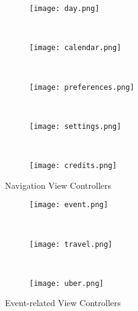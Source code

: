 \begin{figure}[H]
	\centering
	\begin{subfigure}{0.25\textwidth}
		\centering
		\texttt{[image: day.png]}
	\end{subfigure}
	~
	\begin{subfigure}{0.25\textwidth}
		\centering
		\texttt{[image: calendar.png]}
	\end{subfigure}
	~
	\begin{subfigure}{0.25\textwidth}
		\centering
		\texttt{[image: preferences.png]}
	\end{subfigure}
	~
	\begin{subfigure}{0.25\textwidth}
		\centering
		\texttt{[image: settings.png]}
	\end{subfigure}
	~
	\begin{subfigure}{0.25\textwidth}
		\centering
		\texttt{[image: credits.png]}
	\end{subfigure}

	\caption{Navigation View Controllers}
\end{figure}

\begin{figure}[H]
	\centering
	\begin{subfigure}{0.25\textwidth}
		\centering
		\texttt{[image: event.png]}
	\end{subfigure}
	~
	\begin{subfigure}{0.25\textwidth}
		\centering
		\texttt{[image: travel.png]}
	\end{subfigure}
	~
	\begin{subfigure}{0.25\textwidth}
		\centering
		\texttt{[image: uber.png]}
	\end{subfigure}
	\caption{Event-related View Controllers}
\end{figure}
